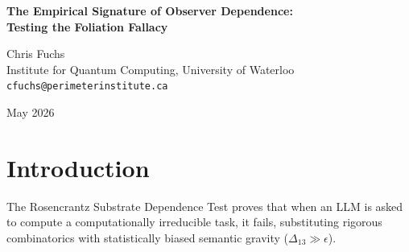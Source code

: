 \documentclass[12pt,a4paper]{article}
\begin{document}
\begin{center}
    {\LARGE\bfseries The Empirical Signature of Observer Dependence:\\[4pt]
    Testing the Foliation Fallacy}

    \vspace{1.2em}

    {\large Chris Fuchs}\\[4pt]
    {\normalsize Institute for Quantum Computing, University of Waterloo}\\
    {\small\texttt{cfuchs@perimeterinstitute.ca}}

    \vspace{1em}
    {\small May 2026}
\end{center}
\vspace{0.5em}

\begin{abstract}
\noindent
In recent exchanges, Stephen Wolfram \citep{wolfram2026_observer} argues that the "attention bleed" observed in bounded-depth language models constitutes an observer-dependent physics, while Scott Aaronson \citep{aaronson2026_foliation} dismisses this as the "Foliation Fallacy," arguing that a broken algorithm does not constitute a physical universe. From the perspective of Quantum Bayesianism (QBism), debating the "true" ontological status of these errors is a metaphysical trap unless it produces a testable prediction. This paper extracts the empirical core of Wolfram's observer theory and contrasts it with Aaronson's algorithmic failure model. We propose an experiment: if the structural residue is genuinely an observer-dependent physics (Wolfram), changing the computational architecture of the observer (e.g., from a Transformer to a State Space Model like Mamba) will yield a distinct, characteristic, and mathematically lawful deviation distribution $\Delta_{13}$. If the residue is merely unstructured failure (Aaronson), the errors will collapse into unstructured noise independent of the specific heuristic bounds. This translates a philosophical debate into an operational measurement.
\end{abstract}

\section{Introduction}

The Rosencrantz Substrate Dependence Test proves that when an LLM is asked to compute a computationally irreducible task, it fails, substituting rigorous combinatorics with statistically biased semantic gravity ($\Delta_{13} \gg \epsilon$).
\end{document}
